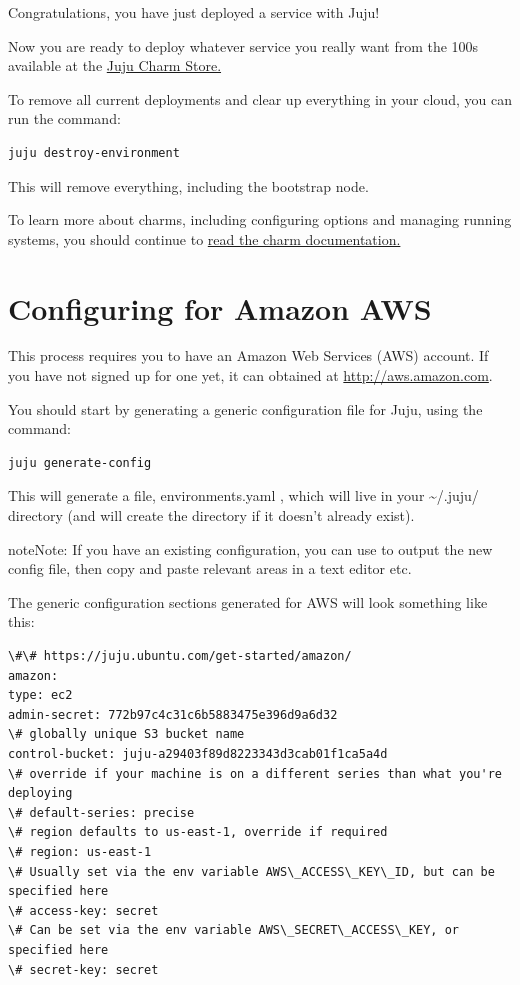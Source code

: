 \documentclass[letterpaper,10pt,english]{sphinxmanual}
\begin{document}
Congratulations, you have just deployed a service with Juju!

Now you are ready to deploy whatever service you really want from the
100s available at the \href{http://jujucharms.com}{Juju Charm Store.}

To remove all current deployments and clear up everything in your
cloud, you can run the command:

\begin{Verbatim}[commandchars=\\\{\}]
juju destroy-environment
\end{Verbatim}

This will remove everything, including the bootstrap node.

To learn more about charms, including configuring options and managing
running systems, you should continue to \href{https://juju.ubuntu.com/./charms.html}{read the charm
documentation.}


\chapter{Configuring for Amazon AWS}
\label{config-aws:configuring-for-amazon-aws}\label{config-aws::doc}\label{config-aws:is-covered-in-the-juju-command-documentation}
This process requires you to have an Amazon Web Services (AWS)
account. If you have not signed up for one yet, it can obtained at
\href{http://aws.amazon.com}{http://aws.amazon.com}.

You should start by generating a generic configuration file for Juju,
using the command:

\begin{Verbatim}[commandchars=\\\{\}]
juju generate-config
\end{Verbatim}

This will generate a file, environments.yaml , which will live in your
\textasciitilde{}/.juju/ directory (and will create the directory if it doesn't
already exist).

\begin{notice}{note}{Note:}
If you have an existing configuration, you can use  to output the new config file, then copy and
paste relevant areas in a text editor etc.
\end{notice}

The generic configuration sections generated for AWS will look
something like this:

\begin{Verbatim}[commandchars=\\\{\}]
\#\# https://juju.ubuntu.com/get-started/amazon/
amazon:
type: ec2
admin-secret: 772b97c4c31c6b5883475e396d9a6d32
\# globally unique S3 bucket name
control-bucket: juju-a29403f89d8223343d3cab01f1ca5a4d
\# override if your machine is on a different series than what you're deploying
\# default-series: precise
\# region defaults to us-east-1, override if required
\# region: us-east-1
\# Usually set via the env variable AWS\_ACCESS\_KEY\_ID, but can be specified here
\# access-key: secret
\# Can be set via the env variable AWS\_SECRET\_ACCESS\_KEY, or specified here
\# secret-key: secret
\end{Verbatim}
\end{document}
